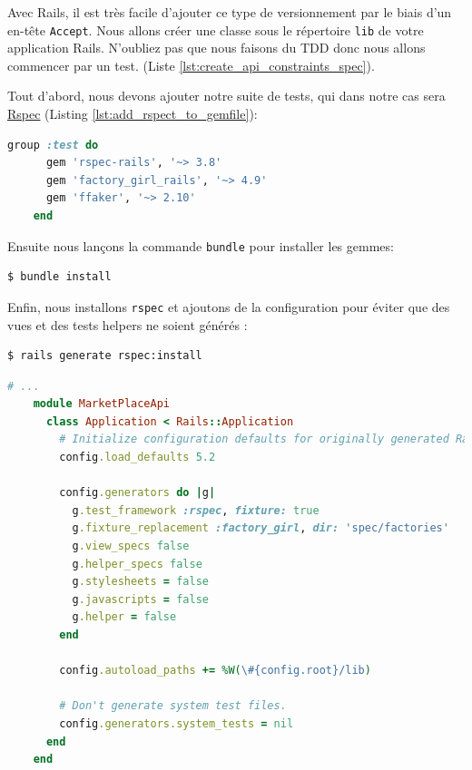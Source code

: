 \documentclass[]{report}
\begin{document}
    Avec Rails, il est très facile d'ajouter ce type de versionnement par le biais d'un en-tête \verb|Accept|. Nous allons créer une classe sous le répertoire \verb|lib| de votre application Rails. N'oubliez pas que nous faisons du TDD donc nous allons commencer par un test. (Liste \ref{lst:create_api_constraints_spec}).

    Tout d'abord, nous devons ajouter notre suite de tests, qui dans notre cas sera \href{http://rspec.info/}{Rspec} (Listing \ref{lst:add_rspect_to_gemfile}):

    \begin{scriptsize}
    \begin{lstlisting}[language=ruby, caption={Gemfile avec la suite de test}, label={lst:add_rspect_to_gemfile}]
    group :test do
      gem 'rspec-rails', '~> 3.8'
      gem 'factory_girl_rails', '~> 4.9'
      gem 'ffaker', '~> 2.10'
    end
    \end{lstlisting}
    \end{scriptsize}

    Ensuite nous lançons la commande \verb|bundle| pour installer les gemmes:

    \begin{scriptsize}
    \begin{lstlisting}[language=bash]
    $ bundle install
    \end{lstlisting}
    \end{scriptsize}

    Enfin, nous installons \verb|rspec| et ajoutons de la configuration pour éviter que des vues et des tests helpers ne soient générés :

    \begin{scriptsize}
    \begin{lstlisting}[language=bash]
    $ rails generate rspec:install
    \end{lstlisting}
    \end{scriptsize}

    \begin{scriptsize}
    \begin{lstlisting}[language=ruby, caption={Configuration de notre suite de test avec respec  (/config/application.rb)}, label={lst:setup_rspec}]
    # ...
    module MarketPlaceApi
      class Application < Rails::Application
        # Initialize configuration defaults for originally generated Rails version.
        config.load_defaults 5.2

        config.generators do |g|
          g.test_framework :rspec, fixture: true
          g.fixture_replacement :factory_girl, dir: 'spec/factories'
          g.view_specs false
          g.helper_specs false
          g.stylesheets = false
          g.javascripts = false
          g.helper = false
        end

        config.autoload_paths += %W(\#{config.root}/lib)

        # Don't generate system test files.
        config.generators.system_tests = nil
      end
    end
    \end{lstlisting}
    \end{scriptsize}
\end{document}
